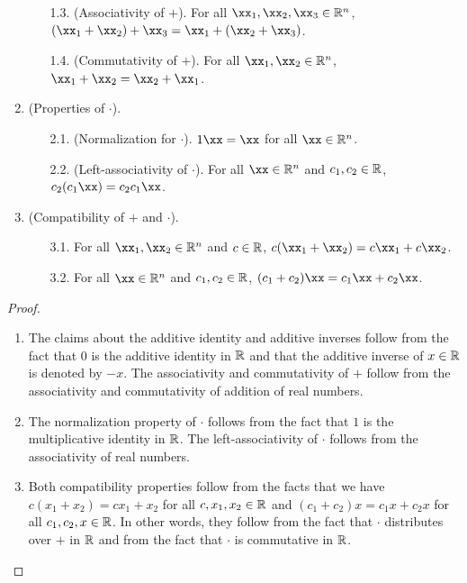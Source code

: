 \begin{theorem}
\begin{enumerate}
\begin{enumerate}
                \item[1.3.] (Associativity of $+$). For all $\xx_1, \xx_2, \xx_3 \in \R^n$, $(\xx_1 + \xx_2) + \xx_3 = \xx_1 + (\xx_2 + \xx_3)$.
                \item[1.4.] (Commutativity of $+$). For all $\xx_1, \xx_2 \in \R^n$, $\xx_1 + \xx_2 = \xx_2 + \xx_1$.
            \end{enumerate}
            \item (Properties of $\cdot$).
            \begin{enumerate}
                \item[2.1.] (Normalization for $\cdot$). $1 \xx = \xx$ for all $\xx \in \R^n$.
                \item[2.2.] (Left-associativity of $\cdot$). For all $\xx \in \R^n$ and $c_1, c_2 \in \mathbb{R}$, $c_2 (c_1 \xx) = c_2 c_1 \xx$.
            \end{enumerate}
            \item (Compatibility of $+$ and $\cdot$).
            \begin{enumerate}
                \item[3.1.] For all $\xx_1, \xx_2 \in \R^n$ and $c \in \mathbb{R}$, $c(\xx_1 + \xx_2) = c \xx_1 + c \xx_2$.
                \item[3.2.] For all $\xx \in \R^n$ and $c_1, c_2 \in \mathbb{R}$, $(c_1 + c_2)\xx = c_1 \xx + c_2 \xx$.
            \end{enumerate}
        \end{enumerate}
\end{theorem}

\begin{proof}
    \mbox{} \\
    \begin{enumerate}
        \item The claims about the additive identity and additive inverses follow from the fact that $0$ is the additive identity in $\mathbb{R}$ and that the additive inverse of $x \in \mathbb{R}$ is denoted by $-x$. The associativity and commutativity of $+$ follow from the associativity and commutativity of addition of real numbers.
        \item The normalization property of $\cdot$ follows from the fact that $1$ is the multiplicative identity in $\mathbb{R}$. The left-associativity of $\cdot$ follows from the associativity of real numbers.
        \item Both compatibility properties follow from the facts that we have $c (x_1 + x_2) = c x_1 + x_2$ for all $c, x_1, x_2 \in \mathbb{R}$ and $(c_1 + c_2) x = c_1 x + c_2 x$ for all $c_1, c_2, x \in \mathbb{R}$. In other words, they follow from the fact that $\cdot$ distributes over $+$ in $\mathbb{R}$ and from the fact that $\cdot$ is commutative in $\mathbb{R}$.
    \end{enumerate} 
\end{proof}

